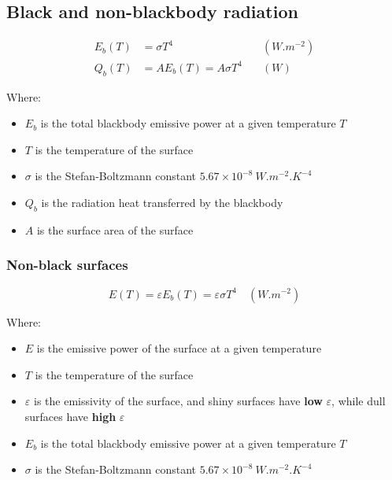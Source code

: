 \documentclass[11pt]{article}
\begin{document}
\subsection{Black and non-blackbody radiation}
\label{sec:org084be5b}
\begin{align*}
E_b (T) &= \sigma T^4 \quad & (\unit{W.m^{-2}}) \\
Q_b (T) &= AE_b (T) = A \sigma T^4 \quad & (\unit{W})
\end{align*}

Where:
\begin{itemize}
\item \(E_b\) is the total blackbody emissive power at a given temperature \(T\)
\item \(T\) is the temperature of the surface
\item \(\sigma\) is the Stefan-Boltzmann constant \(5.67 \times 10^{-8} \ \unit{W.m^{-2}.K^{-4}}\)
\item \(Q_b\) is the radiation heat transferred by the blackbody
\item \(A\) is the surface area of the surface
\end{itemize}

\subsubsection{Non-black surfaces}
\label{sec:orgf090dca}
\[E(T) = \varepsilon E_b (T) = \varepsilon \sigma T^4 \quad (\unit{W.m^{-2}})\]

Where:
\begin{itemize}
\item \(E\) is the emissive power of the surface at a given temperature
\item \(T\) is the temperature of the surface
\item \(\varepsilon\) is the emissivity of the surface, and shiny surfaces have \textbf{low} \(\varepsilon\), while dull surfaces have \textbf{high} \(\varepsilon\)
\item \(E_b\) is the total blackbody emissive power at a given temperature \(T\)
\item \(\sigma\) is the Stefan-Boltzmann constant \(5.67 \times 10^{-8} \ \unit{W.m^{-2}.K^{-4}}\)
\end{itemize}
\end{document}
